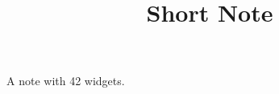 \documentclass{article}
\title{Short Note}
\begin{document}
A note with 42 widgets. %
\end{document}
